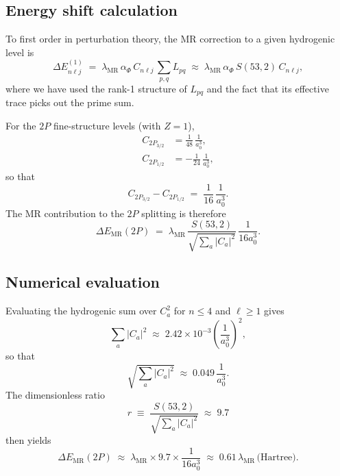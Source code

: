 \documentclass[11pt,a4paper]{article}
\begin{document}
\subsection{Energy shift calculation}
To first order in perturbation theory, the MR correction to a given
hydrogenic level is
\begin{equation}
  \Delta E^{(1)}_{n\ell j}
  \;=\;
  \lambda_{\mathrm{MR}} \,\alpha_\Phi \,
  C_{n\ell j} \,
  \sum_{p,q} L_{pq}
  \;\approx\;
  \lambda_{\mathrm{MR}} \,\alpha_\Phi \, S(53,2)\, C_{n\ell j},
\end{equation}
where we have used the rank-1 structure of $L_{pq}$ and the fact that
its effective trace picks out the prime sum.

For the $2P$ fine-structure levels (with $Z=1$),
\begin{align}
  C_{2P_{3/2}} &= \frac{1}{48}\,\frac{1}{a_0^3}, \\
  C_{2P_{1/2}} &= -\frac{1}{24}\,\frac{1}{a_0^3},
\end{align}
so that
\begin{equation}
  C_{2P_{3/2}} - C_{2P_{1/2}}
  \;=\;
  \frac{1}{16}\,\frac{1}{a_0^3}.
\end{equation}
The MR contribution to the $2P$ splitting is therefore
\begin{equation}
  \Delta E_{\mathrm{MR}}(2P)
  \;=\;
  \lambda_{\mathrm{MR}} \,
  \frac{S(53,2)}{\sqrt{\sum_a |C_a|^2}} \,
  \frac{1}{16 a_0^3}.
\end{equation}

\subsection{Numerical evaluation}
Evaluating the hydrogenic sum over $C_a^2$ for $n\le 4$ and $\ell\ge 1$
gives
\begin{equation}
  \sum_a |C_a|^2 \;\approx\;
  2.42\times 10^{-3} \left(\frac{1}{a_0^3}\right)^2,
\end{equation}
so that
\begin{equation}
  \sqrt{\sum_a |C_a|^2}
  \;\approx\;
  0.049\,\frac{1}{a_0^3}.
\end{equation}
The dimensionless ratio
\begin{equation}
  r \;\equiv\; \frac{S(53,2)}{\sqrt{\sum_a |C_a|^2}}
  \;\approx\;
  9.7
\end{equation}
then yields
\begin{equation}
  \Delta E_{\mathrm{MR}}(2P)
  \;\approx\;
  \lambda_{\mathrm{MR}} \times 9.7 \times \frac{1}{16 a_0^3}
  \;\approx\;
  0.61\,\lambda_{\mathrm{MR}}\,\text{(Hartree)}.
\end{equation}
\end{document}
